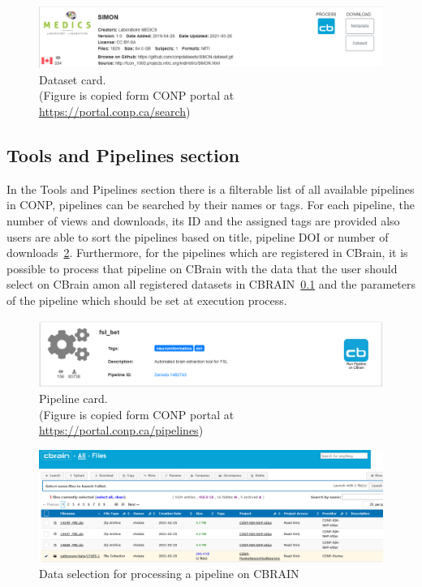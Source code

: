 \begin{figure}[ht]
  \centering
  \includegraphics[width=\textwidth]{figures/dataCard.png}
  \caption{Dataset card. \\(Figure is copied form CONP portal at \url{https://portal.conp.ca/search})}
  \label{fig:data_card}
\end{figure} 


\subsection{Tools and Pipelines section}
In the Tools and Pipelines section there is a filterable list of all available pipelines in CONP,
pipelines can be searched by their names or tags. For each pipeline, the number of views and downloads, its ID and the assigned tags are provided also users are able to sort the pipelines based on title, pipeline DOI or number of downloads~\ref{fig:pipeline_card}. Furthermore, for the pipelines which are registered in CBrain, it is possible to process that pipeline on CBrain with the data that the user should select on CBrain amon all registered datasets in CBRAIN~\ref{} and the parameters of the pipeline which should be set at execution process. 
\begin{figure}[ht]
  \centering
  \includegraphics[width=\textwidth]{figures/pipelinecard.png}
  \caption{Pipeline card. \\(Figure is copied form CONP portal at \url{https://portal.conp.ca/pipelines})}
  \label{fig:pipeline_card}
\end{figure} 

\begin{figure}[ht]
  \centering
  \includegraphics[width=\textwidth]{figures/CBRAIN.png}
  \caption{Data selection for processing a pipeline on CBRAIN }
  \label{fig:cbrainDataSelection}
\end{figure} 

